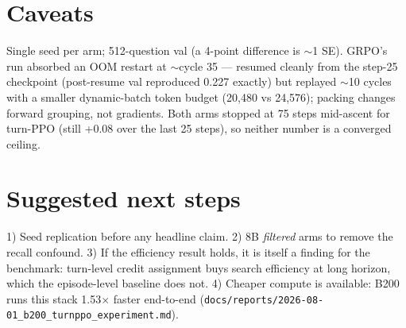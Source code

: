 \documentclass[10pt]{article}
\newcommand{\code}[1]{\texttt{\small #1}}
\begin{document}
\section{Caveats}
Single seed per arm; 512-question val (a 4-point difference is $\sim$1 SE). GRPO's run
absorbed an OOM restart at $\sim$cycle 35 --- resumed cleanly from the step-25 checkpoint
(post-resume val reproduced 0.227 exactly) but replayed $\sim$10 cycles with a smaller
dynamic-batch token budget (20{,}480 vs 24{,}576); packing changes forward grouping, not
gradients. Both arms stopped at 75 steps mid-ascent for turn-PPO (still +0.08 over the last
25 steps), so neither number is a converged ceiling.

\section{Suggested next steps}
1) Seed replication before any headline claim. 2) 8B \emph{filtered} arms to remove the
recall confound. 3) If the efficiency result holds, it is itself a finding for the
benchmark: turn-level credit assignment buys search efficiency at long horizon, which the
episode-level baseline does not. 4) Cheaper compute is available: B200 runs this stack
1.53$\times$ faster end-to-end (\code{docs/reports/2026-08-01\_b200\_turnppo\_experiment.md}).
\end{document}
